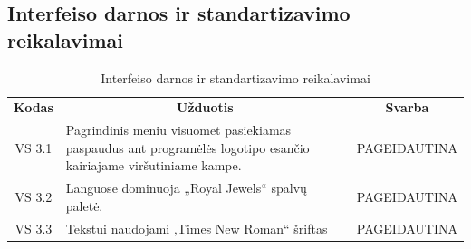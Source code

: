 \documentclass{VUMIFPSkursinis}
\begin{document}
\subsection{Interfeiso darnos ir standartizavimo reikalavimai}
\begin{center}
	\begin{table}[H]
	\caption{Interfeiso darnos ir standartizavimo reikalavimai}
	\begin{tabular}{|p{2cm}|p{14cm}|p{2cm}|}
	\hline
	    \rowcolor{lightgray}
	    \multicolumn{3}{|c|}{Interfeiso darnos ir standartizavimo reikalavimai}\\
	\hline
		\multicolumn{1}{|c|}{{\bfseries Kodas}}&
		\multicolumn{1}{|c|}{ {\bfseries Užduotis}}&
		\multicolumn{1}{|c|}{{\bfseries Svarba}}\\		
	\hline
		\multicolumn{1}{|c|}{VS 3.1}&
		\multicolumn{1}{|p{12,9cm}|}{Pagrindinis meniu visuomet pasiekiamas paspaudus ant programėlės logotipo esančio kairiajame viršutiniame kampe.}& 
		\multicolumn{1}{|p{1.5cm}|}{PAGEIDAUTINA}\\
	\hline
		\multicolumn{1}{|c|}{VS 3.2}&
		\multicolumn{1}{|p{12cm}|}{Languose dominuoja „Royal Jewels“ spalvų paletė.}& 
		\multicolumn{1}{|p{1.5cm}|}{PAGEIDAUTINA}\\
	\hline
		\multicolumn{1}{|c|}{VS 3.3}&
		\multicolumn{1}{|p{12cm}|}{Tekstui naudojami ‚Times New Roman“ šriftas}& 
		\multicolumn{1}{|p{1.5cm}|}{PAGEIDAUTINA}\\
	\hline  	 	
	
	\end{tabular}
	
	\label{table:4}
	\end{table}

\end{center}
\end{document}
